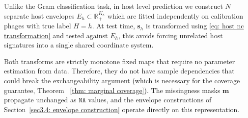 Unlike the Gram classification task, in host level prediction we construct $N$ separate host envelopes $E_h \subset 
\mathbb{R}_+^{K_h}$ which are fitted independently on calibration phages with true label $H = h$. At test time, $\mathbf{s}_h$ 
is transformed using \eqref{eq: host nc transformation} and tested against $E_h$, this avoids forcing unrelated host signatures 
into a single shared coordinate system.

Both transforms are strictly monotone fixed maps that require no parameter estimation from data. Therefore, they do 
not have sample dependencies that could break the exchangeability argument (which is necessary for the coverage guarantee, Theorem
~\ref{thm: marginal coverage}). The missingness masks $\mathbf{m}$ propagate unchanged as $\texttt{NA}$ values, and the 
envelope constructions of Section~\ref{sec3.4: envelope construction} operate directly on this representation.

